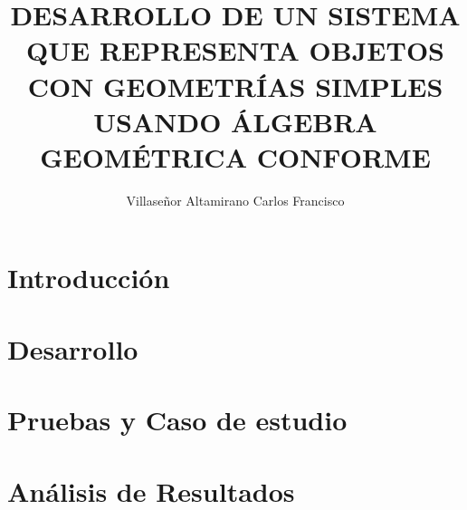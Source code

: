 \documentclass[
  oneside,
  twoside,
  12pt, letterpaper,
  footinclude=true,
  headinclude=true,
  cleardoublepage=empty
  spanish
]{scrbook}
\title{DESARROLLO DE UN SISTEMA QUE REPRESENTA OBJETOS
	CON GEOMETRÍAS SIMPLES USANDO ÁLGEBRA GEOMÉTRICA CONFORME}
\author{Villaseñor Altamirano Carlos Francisco}
\begin{document}
    \frontmatter
    
    
    
    
    
    
    \mainmatter
    
    \chapter{Introducción}
        
        
        
        
        
        
        
        
        
    
    
    \chapter{Desarrollo}
    \setcounter{figure}{0}
    \setcounter{table}{0}
    
        
        
        
        
        
        
    \chapter{Pruebas y Caso de estudio}
    \setcounter{figure}{0}
    \setcounter{table}{0}
    
        
        
    \chapter{Análisis de Resultados}
    \setcounter{figure}{0}
    \setcounter{table}{0}
    
\end{document}
